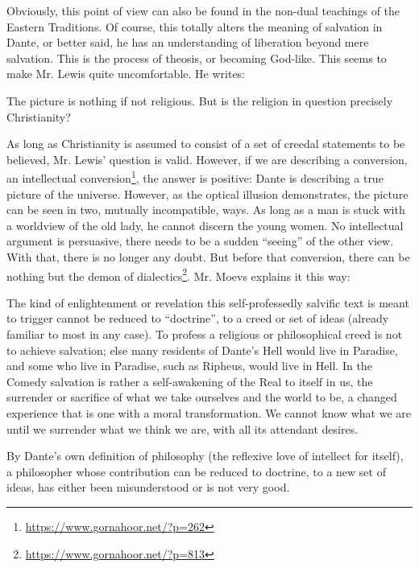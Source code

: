 Obviously, this point of view can also be found in the non-dual teachings of the Eastern Traditions. Of course, this totally alters the meaning of salvation in Dante, or better said, he has an understanding of liberation beyond mere salvation. This is the process of theosis, or becoming God-like. This seems to make Mr. Lewis quite uncomfortable. He writes:

\begin{quotex}
The picture is nothing if not religious. But is the religion in question precisely Christianity?
\end{quotex}

As long as Christianity is assumed to consist of a set of creedal statements to be believed, Mr. Lewis' question is valid. However, if we are describing a conversion, an intellectual conversion\footnote{\url{https://www.gornahoor.net/?p=262}}, the answer is positive: Dante is describing a true picture of the universe. However, as the optical illusion demonstrates, the picture can be seen in two, mutually incompatible, ways. As long as a man is stuck with a worldview of the old lady, he cannot discern the young women. No intellectual argument is persuasive, there needs to be a sudden ``seeing'' of the other view. With that, there is no longer any doubt. But before that conversion, there can be nothing but the demon of dialectics\footnote{\url{https://www.gornahoor.net/?p=813}}. Mr. Moevs explains it this way:

\begin{quotationx}
The kind of enlightenment or revelation this self-professedly salvific text is meant to trigger cannot be reduced to ``doctrine'', to a creed or set of ideas (already familiar to most in any case). To profess a religious or philosophical creed is not to achieve salvation; else many residents of Dante's Hell would live in Paradise, and some who live in Paradise, such as Ripheus, would live in Hell. In the Comedy salvation is rather a self-awakening of the Real to itself in us, the surrender or sacrifice of what we take ourselves and the world to be, a changed experience that is one with a moral transformation. We cannot know what we are until we surrender what we think we are, with all its attendant desires.

By Dante's own definition of philosophy (the reflexive love of intellect for itself), a philosopher whose contribution can be reduced to doctrine, to a new set of ideas, has either been misunderstood or is not very good.
\end{quotationx}


